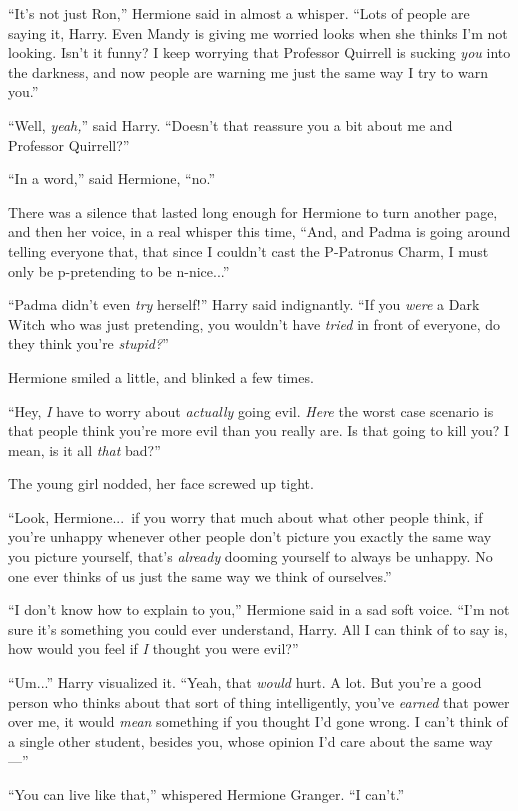 “It’s not just Ron,” Hermione said in almost a whisper. “Lots of people are saying it, Harry. Even Mandy is giving me worried looks when she thinks I’m not looking. Isn’t it funny? I keep worrying that Professor Quirrell is sucking \emph{you} into the darkness, and now people are warning me just the same way I try to warn you.”

“Well, \emph{yeah,}” said Harry. “Doesn’t that reassure you a bit about me and Professor Quirrell?”

“In a word,” said Hermione, “no.”

There was a silence that lasted long enough for Hermione to turn another page, and then her voice, in a real whisper this time, “And, and Padma is going around telling everyone that, that since I couldn’t cast the P-Patronus Charm, I must only be p-pretending to be n-nice...”

“Padma didn’t even \emph{try} herself!” Harry said indignantly. “If you \emph{were} a Dark Witch who was just pretending, you wouldn’t have \emph{tried} in front of everyone, do they think you’re \emph{stupid?}”

Hermione smiled a little, and blinked a few times.

“Hey, \emph{I} have to worry about \emph{actually} going evil. \emph{Here} the worst case scenario is that people think you’re more evil than you really are. Is that going to kill you? I mean, is it all \emph{that} bad?”

The young girl nodded, her face screwed up tight.

“Look, Hermione...\ if you worry that much about what other people think, if you’re unhappy whenever other people don’t picture you exactly the same way you picture yourself, that’s \emph{already} dooming yourself to always be unhappy. No one ever thinks of us just the same way we think of ourselves.”

“I don’t know how to explain to you,” Hermione said in a sad soft voice. “I’m not sure it’s something you could ever understand, Harry. All I can think of to say is, how would you feel if \emph{I} thought you were evil?”

“Um...” Harry visualized it. “Yeah, that \emph{would} hurt. A lot. But you’re a good person who thinks about that sort of thing intelligently, you’ve \emph{earned} that power over me, it would \emph{mean} something if you thought I’d gone wrong. I can’t think of a single other student, besides you, whose opinion I’d care about the same way—”

“You can live like that,” whispered Hermione Granger. “I can’t.”

